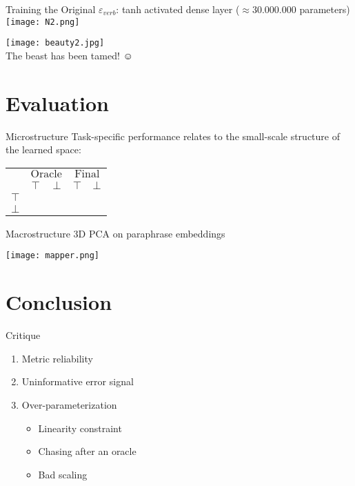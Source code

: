 \documentclass{beamer}
\begin{document}
\begin{frame}{Training the Original}
$\varepsilon_{verb}$: \alert{tanh activated dense layer} ($\approx 30.000.000$ parameters)
\texttt{[image: N2.png]}
\end{frame}

\begin{frame}[standout]
\texttt{[image: beauty2.jpg]}\\
The beast has been tamed! {\DejaSans ☺} 
\end{frame}

\section{Evaluation}

\begin{frame}{Microstructure}
Task-specific performance relates to the small-scale structure of the learned space:
\vspace{10pt}

\begin{tabular}{c|SS|SS} \toprule
    {} & 
     & 
    \\
    & $\top$ & $\bot$ & $\top$ & $\bot$\\
    \midrule
    $\top$  & \color{Yes}{0.92} & \color{No}{0.08} & \color{Yes}{0.88} & \color{No}{0.02} \\
    $\bot$  & \color{No}{0.08} & \color{Yes}{0.92} & \color{No}{0.12} & \color{Yes}{0.98} \\
   \bottomrule
\end{tabular}
\end{frame}

\begin{frame}{Macrostructure}
\alert{3D PCA on paraphrase embeddings}

\texttt{[image: mapper.png]}
\end{frame}

\section{Conclusion}

\begin{frame}{Critique}
\begin{enumerate}
\item Metric reliability
\item Uninformative error signal
\item Over-parameterization
\begin{itemize}
\item[a)] Linearity constraint
\item[b)] Chasing after an oracle
\item[c)] Bad scaling
\end{itemize}
\end{enumerate}
\end{frame}
\end{document}
